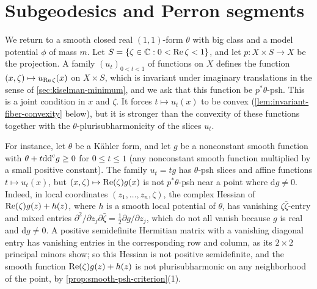 









\section{Subgeodesics and Perron segments}
\label{sec:relative-weak-geodesics}
We return to a smooth closed real $(1,1)$-form $\theta$ with big class and a model potential $\phi$ of mass $m$. Let $S=\{\zeta\in\mathbb C:0<\operatorname{Re}\zeta<1\}$, and let $p\colon X\times S\to X$ be the projection. A family $(u_t)_{0<t<1}$ of functions on $X$ defines the function $(x,\zeta)\mapsto u_{\operatorname{Re}\zeta}(x)$ on $X\times S$, which is invariant under imaginary translations in the sense of \cref{sec:kiselman-minimum}, and we ask that this function be $p^*\theta$-psh. This is a joint condition in $x$ and $\zeta$. It forces $t\mapsto u_t(x)$ to be convex (\cref{lem:invariant-fiber-convexity} below), but it is stronger than the convexity of these functions together with the $\theta$-plurisubharmonicity of the slices $u_t$.

For instance, let $\theta$ be a K\"ahler form, and let $g$ be a nonconstant smooth function with $\theta+t\mathrm{dd}^{\mathrm{c}} g\geq0$ for $0\leq t\leq1$ (any nonconstant smooth function multiplied by a small positive constant). The family $u_t=tg$ has $\theta$-psh slices and affine functions $t\mapsto u_t(x)$, but $(x,\zeta)\mapsto\operatorname{Re}(\zeta)g(x)$ is not $p^*\theta$-psh near a point where $\mathrm dg\neq0$. Indeed, in local coordinates $(z_1,\ldots,z_n,\zeta)$, the complex Hessian of $\operatorname{Re}(\zeta)g(z)+h(z)$, where $h$ is a smooth local potential of $\theta$, has vanishing $\zeta\bar\zeta$-entry and mixed entries $\partial^2/\partial z_j\partial\bar\zeta=\frac12\partial g/\partial z_j$, which do not all vanish because $g$ is real and $\mathrm dg\neq0$. A positive semidefinite Hermitian matrix with a vanishing diagonal entry has vanishing entries in the corresponding row and column, as its $2\times2$ principal minors show; so this Hessian is not positive semidefinite, and the smooth function $\operatorname{Re}(\zeta)g(z)+h(z)$ is not plurisubharmonic on any neighborhood of the point, by \cref{prop:smooth-psh-criterion}(1).

